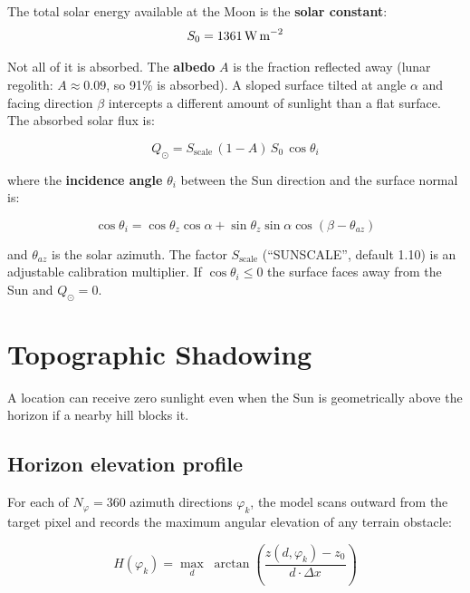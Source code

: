 \documentclass[12pt, a4paper]{article}
\begin{document}
The total solar energy available at the Moon is the
\textbf{solar constant}:
\begin{equation}
  S_0 = 1361\,\text{W\,m}^{-2}
  \label{eq:solar_constant}
\end{equation}

Not all of it is absorbed.
The \textbf{albedo} $A$ is the fraction reflected away
(lunar regolith: $A \approx 0.09$, so 91\% is absorbed).
A sloped surface tilted at angle $\alpha$ and facing direction
$\beta$ intercepts a different amount of sunlight than a flat surface.
The absorbed solar flux is:

\begin{equation}
  Q_{\odot} = S_{\text{scale}}\,(1 - A)\,S_0\,\cos\theta_i
  \label{eq:solar_flux}
\end{equation}

where the \textbf{incidence angle} $\theta_i$ between the Sun
direction and the surface normal is:

\begin{equation}
  \cos\theta_i =
    \cos\theta_z\cos\alpha
    + \sin\theta_z\sin\alpha\cos(\beta - \theta_{az})
  \label{eq:incidence}
\end{equation}

and $\theta_{az}$ is the solar azimuth.
The factor $S_{\text{scale}}$ (``SUNSCALE'', default 1.10) is
an adjustable calibration multiplier.
If $\cos\theta_i \le 0$ the surface faces away from the Sun
and $Q_{\odot} = 0$.

\section{Topographic Shadowing}

A location can receive zero sunlight even when the Sun is
geometrically above the horizon if a nearby hill blocks it.

\subsection{Horizon elevation profile}

For each of $N_{\varphi} = 360$ azimuth directions $\varphi_k$,
the model scans outward from the target pixel and records the
maximum angular elevation of any terrain obstacle:

\begin{equation}
  H(\varphi_k)
  = \max_{d}\; \arctan\!\left(
      \frac{z(d,\varphi_k) - z_0}{\,d\cdot\Delta x\,}
    \right)
  \label{eq:horizon}
\end{equation}
\end{document}
